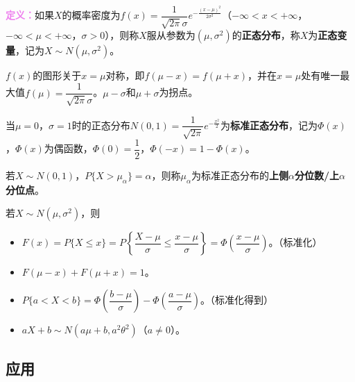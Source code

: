 \documentclass[UTF8, 12pt]{ctexart}
\begin{document}
\textcolor{violet}{\textbf{定义：}}如果$X$的概率密度为$f(x)=\dfrac{1}{\sqrt{2\pi}\sigma}e^{-\frac{(x-\mu)^2}{2\sigma^2}}$（$-\infty<x<+\infty$，$-\infty<\mu<+\infty$，$\sigma>0$），则称$X$服从参数为$(\mu,\sigma^2)$的\textbf{正态分布}，称$X$为\textbf{正态变量}，记为$X\sim N(\mu,\sigma^2)$。

$f(x)$的图形关于$x=\mu$对称，即$f(\mu-x)=f(\mu+x)$，并在$x=\mu$处有唯一最大值$f(\mu)=\dfrac{1}{\sqrt{2\pi}\sigma}$。$\mu-\sigma$和$\mu+\sigma$为拐点。


当$\mu=0$，$\sigma=1$时的正态分布$N(0,1)=\dfrac{1}{\sqrt{2\pi}}e^{-\frac{x^2}{2}}$为\textbf{标准正态分布}，记为$\varPhi(x)$，$\varPhi(x)$为偶函数，$\varPhi(0)=\dfrac{1}{2}$，$\varPhi(-x)=1-\varPhi(x)$。

若$X\sim N(0,1)$，$P\{X>\mu_\alpha\}=\alpha$，则称$\mu_\alpha$为标准正态分布的\textbf{上侧$\alpha$分位数/上$\alpha$分位点}。

若$X\sim N(\mu,\sigma^2)$，则

\begin{itemize}
    \item $F(x)=P\{X\leqslant x\}=P\left\{\dfrac{X-\mu}{\sigma}\leqslant\dfrac{x-\mu}{\sigma}\right\}=\varPhi\left(\dfrac{x-\mu}{\sigma}\right)$。（标准化）
    \item $F(\mu-x)+F(\mu+x)=1$。
    \item $P\{a<X<b\}=\varPhi\left(\dfrac{b-\mu}{\sigma}\right)-\varPhi\left(\dfrac{a-\mu}{\sigma}\right)$。（标准化得到）
    \item $aX+b\sim N(a\mu+b,a^2\theta^2)$（$a\neq0$）。
\end{itemize}

\subsection{应用}
\end{document}
